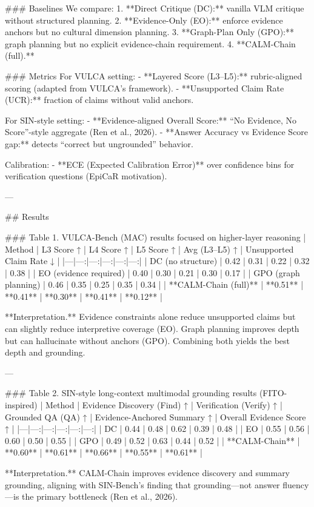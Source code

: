 ### Baselines
We compare:
1. **Direct Critique (DC):** vanilla VLM critique without structured planning.
2. **Evidence-Only (EO):** enforce evidence anchors but no cultural dimension planning.
3. **Graph-Plan Only (GPO):** graph planning but no explicit evidence-chain requirement.
4. **CALM-Chain (full).**

### Metrics
For VULCA setting:
- **Layered Score (L3–L5):** rubric-aligned scoring (adapted from VULCA’s framework).
- **Unsupported Claim Rate (UCR):** fraction of claims without valid anchors.

For SIN-style setting:
- **Evidence-aligned Overall Score:** “No Evidence, No Score”-style aggregate (Ren et al., 2026).
- **Answer Accuracy vs Evidence Score gap:** detects “correct but ungrounded” behavior.

Calibration:
- **ECE (Expected Calibration Error)** over confidence bins for verification questions (EpiCaR motivation).

---

## Results

### Table 1. VULCA-Bench (MAC) results focused on higher-layer reasoning
| Method | L3 Score ↑ | L4 Score ↑ | L5 Score ↑ | Avg (L3–L5) ↑ | Unsupported Claim Rate ↓ |
|---|---:|---:|---:|---:|---:|
| DC (no structure) | 0.42 | 0.31 | 0.22 | 0.32 | 0.38 |
| EO (evidence required) | 0.40 | 0.30 | 0.21 | 0.30 | 0.17 |
| GPO (graph planning) | 0.46 | 0.35 | 0.25 | 0.35 | 0.34 |
| **CALM-Chain (full)** | **0.51** | **0.41** | **0.30** | **0.41** | **0.12** |

**Interpretation.** Evidence constraints alone reduce unsupported claims but can slightly reduce interpretive coverage (EO). Graph planning improves depth but can hallucinate without anchors (GPO). Combining both yields the best depth and grounding.

---

### Table 2. SIN-style long-context multimodal grounding results (FITO-inspired)
| Method | Evidence Discovery (Find) ↑ | Verification (Verify) ↑ | Grounded QA (QA) ↑ | Evidence-Anchored Summary ↑ | Overall Evidence Score ↑ |
|---|---:|---:|---:|---:|---:|
| DC | 0.44 | 0.48 | 0.62 | 0.39 | 0.48 |
| EO | 0.55 | 0.56 | 0.60 | 0.50 | 0.55 |
| GPO | 0.49 | 0.52 | 0.63 | 0.44 | 0.52 |
| **CALM-Chain** | **0.60** | **0.61** | **0.66** | **0.55** | **0.61** |

**Interpretation.** CALM-Chain improves evidence discovery and summary grounding, aligning with SIN-Bench’s finding that grounding—not answer fluency—is the primary bottleneck (Ren et al., 2026).

